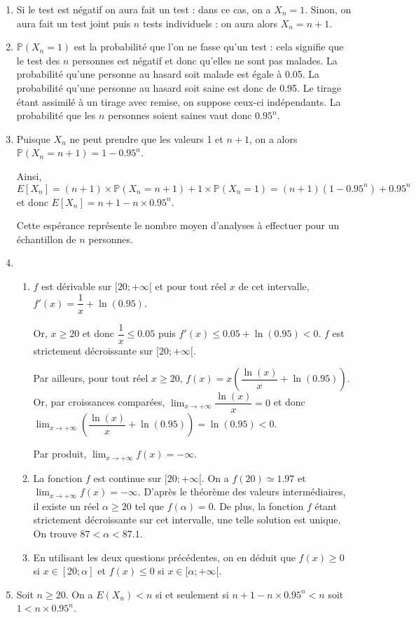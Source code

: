 \documentclass[11pt,fleqn, openany]{book} %
\begin{document}
\begin{solution} \hspace{0pt}

\begin{enumerate}
\item Si le test est négatif on aura fait un test : dans ce cas, on a $X_n = 1$. Sinon, on aura fait un test joint puis $n$ tests individuels : on aura alors $X_n=n+1$.
\item $\mathbb{P}(X_n = 1)$ est la probabilité que l'on ne fasse qu'un test : cela signifie que le test des $n$ personnes est négatif et donc qu'elles ne sont pas malades. La probabilité qu'une personne au hasard soit malade est égale à 0.05. La probabilité qu'une personne au hasard soit saine est donc de 0.95. Le tirage étant assimilé à un tirage avec remise, on suppose ceux-ci indépendants. La probabilité que les $n$ personnes soient saines vaut donc $0.95^n$.
\item Puisque $X_n$ ne peut prendre que les valeurs 1 et $n+1$, on a alors $\mathbb{P}(X_n = n+1)=1-0.95^n$.

Ainsi, $E[X_n]=(n+1) \times \mathbb{P}(X_n=n+1)+1\times \mathbb{P}(X_n = 1)=(n+1)(1-0.95^n)+0.95^n$ et donc $E[X_n]=n+1-n \times 0.95^n$.

Cette espérance représente le nombre moyen d'analyses à effectuer pour un échantillon de $n$ personnes.
\item \begin{enumerate}
\item $f$ est dérivable sur $[20;+\infty[$ et pour tout réel $x$ de cet intervalle, $f'(x)=\dfrac{1}{x}+\ln(0.95)$.

Or, $x \geqslant 20$ et donc $\dfrac{1}{x}\leqslant 0.05$ puis $f'(x)\leqslant 0.05 + \ln(0.95) < 0$. $f$ est strictement décroissante sur $[20;+\infty[$.

Par ailleurs, pour tout réel $x\geqslant 20$, $f(x)=x\left(\dfrac{\ln(x)}{x}+\ln(0.95)\right)$. Or, par croissances comparées, $\displaystyle\lim_{x\to+\infty}\dfrac{\ln(x)}{x}=0$ et donc $\displaystyle\lim_{x\to+\infty}\left(\dfrac{\ln(x)}{x}+\ln(0.95)\right)=\ln(0.95)<0$. 

Par produit, $\displaystyle\lim_{x\to+\infty}f(x)=-\infty$.
\item La fonction $f$ est continue sur $[20;+\infty[$. On a $f(20)\simeq 1.97$ et  $\displaystyle\lim_{x\to+\infty}f(x)=-\infty$. D'après le théorème des valeurs intermédiaires, il existe un réel $\alpha \geqslant 20$ tel que $f(\alpha)=0$. De plus, la fonction $f$ étant strictement décroissante sur cet intervalle, une telle solution est unique. On trouve $87 < \alpha < 87.1$.
\item En utilisant les deux questions précédentes, on en déduit que $f(x)\geqslant 0$ si $x\in[20;\alpha ]$ et $f(x) \leqslant 0$ si $x\in [\alpha ;  +\infty[$.
\end{enumerate}
\item Soit $n\geqslant 20$. On a $E(X_n)<n$ si et seulement si $n+1-n \times 0.95^n <n$ soit $1 < n \times 0.95^n$.


\end{enumerate}
\end{solution}
\end{document}
